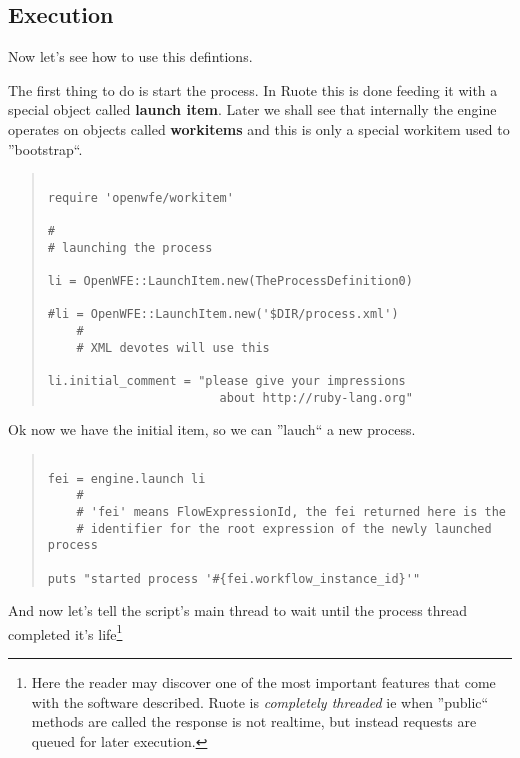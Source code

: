     \subsection{Execution}

        Now let's see how to use this defintions.

        The first thing to do is start the process. In Ruote this is done feeding it with
        a special object called \textbf{launch item}. Later we shall see that internally 
        the engine operates on objects called \textbf{workitems} and this is only a special
        workitem used to ''bootstrap``.

        \begin{quote}
        \begin{verbatim}

require 'openwfe/workitem'

#
# launching the process

li = OpenWFE::LaunchItem.new(TheProcessDefinition0)

#li = OpenWFE::LaunchItem.new('$DIR/process.xml')
    #
    # XML devotes will use this

li.initial_comment = "please give your impressions
                        about http://ruby-lang.org"

        \end{verbatim}
        \end{quote}

        Ok now we have the initial item, so we can ''lauch`` a new process.

        \begin{quote}
        \begin{verbatim}

fei = engine.launch li
    #
    # 'fei' means FlowExpressionId, the fei returned here is the
    # identifier for the root expression of the newly launched process

puts "started process '#{fei.workflow_instance_id}'"

        \end{verbatim}
        \end{quote}

        And now let's tell the script's main thread to wait until the process thread 
        completed it's life\footnote{Here the reader may discover one of the most 
        important features that come with the software described. Ruote is 
        \emph{completely threaded} ie when ''public`` methods are called the response 
        is not realtime, but instead requests are queued for later execution. }

